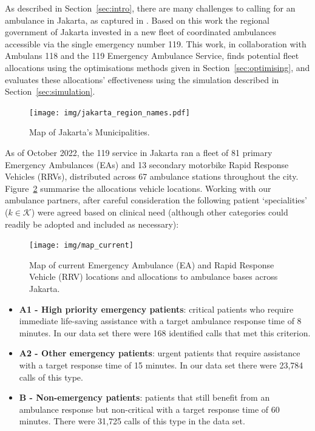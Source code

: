 \documentclass[numbers,webpdf,imaman]{ima-authoring-template}%
\begin{document}
As described in Section~\ref{sec:intro}, there are many challenges to calling
for an ambulance in Jakarta, as captured in \citet{BriceSyaribahNoor2022Esui}.
Based on this work the regional government of Jakarta invested in a new fleet
of coordinated ambulances accessible via the single emergency number 119.
This work, in collaboration with Ambulans 118 and the 119 Emergency Ambulance
Service, finds potential fleet allocations using the optimisations methods
given in Section~\ref{sec:optimising}, and evaluates these allocations'
effectiveness using the simulation described in Section~\ref{sec:simulation}.

\begin{figure}
\begin{center}
\texttt{[image: img/jakarta\_region\_names.pdf]}
\end{center}
\caption{Map of Jakarta's Municipalities.}
\label{fig:region_names}
\end{figure}

As of October 2022, the 119 service in Jakarta ran a fleet of 81 primary
Emergency Ambulances (EAs) and 13 secondary motorbike Rapid Response Vehicles
(RRVs), distributed across 67 ambulance stations throughout the city.
Figure~\ref{fig:current_allocation} summarise the allocations vehicle
locations.
Working with our ambulance partners, after careful consideration the following
patient `specialities' ($k \in \mathcal{K}$) were agreed based on clinical need
(although other categories could readily be adopted and included as necessary):

\begin{figure}
\begin{center}
\texttt{[image: img/map\_current]}
\caption{Map of current Emergency Ambulance (EA) and Rapid Response Vehicle
         (RRV) locations and allocations to ambulance bases across Jakarta.}
\label{fig:current_allocation}
\end{center}
\end{figure}

\begin{itemize}
  \item \textbf{A1 - High priority emergency patients}: critical patients who
  require immediate life-saving assistance with a target ambulance response
  time of 8 minutes. In our data set there were 168 identified calls that met
  this criterion.
  \item \textbf{A2 - Other emergency patients}: urgent patients that require
  assistance with a target response time of 15 minutes. In our data set there
  were 23,784 calls of this type.
  \item \textbf{B - Non-emergency patients}: patients that still benefit from
  an ambulance response but non-critical with a target response time of 60
  minutes. There were 31,725 calls of this type in the data set.
\end{itemize}
\end{document}
